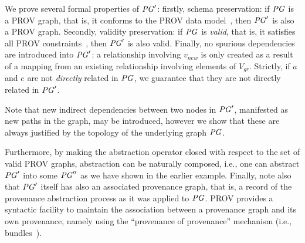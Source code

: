 We prove several formal properties of $\mathit{PG}'$: firstly, schema preservation: if $\mathit{PG}$ is a PROV graph, that is, it conforms to the PROV data model~\citep{w3c-prov-dm}, then $\mathit{PG}'$ is also a PROV graph. Secondly, validity preservation: if $\mathit{PG}$ is \textit{valid}, that is, it satisfies all PROV constraints~\citep{w3c-prov-dm}, then $\mathit{PG}'$ is also valid. Finally, no spurious dependencies are introduced into $\mathit{PG}'$: a  relationship involving $v_{new}$ is only created as a result of a mapping from an existing relationship involving elements of $V_{gr}$. Strictly, if $a$ and $e$ are not \textit{directly} related in $\mathit{PG}$, we guarantee that they are not directly related in $\mathit{PG}'$. 

Note that new indirect dependencies between two nodes in $\mathit{PG}'$, manifested as new paths in the graph, may be introduced, however we show that these are always justified by the topology of the underlying graph $\mathit{PG}$.

Furthermore, by making the abstraction operator closed with respect to the set of valid PROV graphs, abstraction can be naturally composed, i.e., one can abstract $\mathit{PG}'$ into some $\mathit{PG}''$ as we have shown in the earlier example.
%
Finally, note also that $\mathit{PG}'$ itself has also an associated provenance graph, that is, a record of the provenance abstraction process as it was applied to $\mathit{PG}$. 
PROV provides a syntactic facility to maintain the association between a provenance graph and its own provenance, namely using the ``provenance of provenance'' mechanism (i.e., bundles~\citep{w3c-prov-dm}).




%

